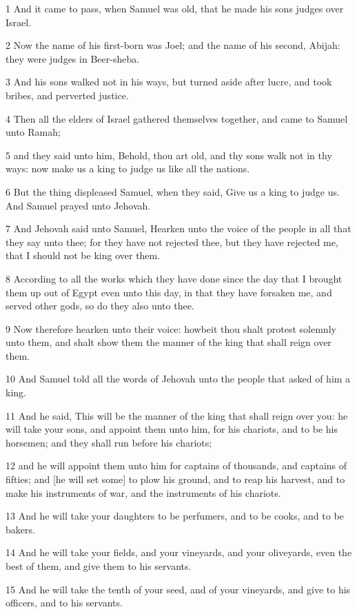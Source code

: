 \par 1 And it came to pass, when Samuel was old, that he made his sons judges over Israel.
\par 2 Now the name of his first-born was Joel; and the name of his second, Abijah: they were judges in Beer-sheba.
\par 3 And his sons walked not in his ways, but turned aside after lucre, and took bribes, and perverted justice.
\par 4 Then all the elders of Israel gathered themselves together, and came to Samuel unto Ramah;
\par 5 and they said unto him, Behold, thou art old, and thy sons walk not in thy ways: now make us a king to judge us like all the nations.
\par 6 But the thing displeased Samuel, when they said, Give us a king to judge us. And Samuel prayed unto Jehovah.
\par 7 And Jehovah said unto Samuel, Hearken unto the voice of the people in all that they say unto thee; for they have not rejected thee, but they have rejected me, that I should not be king over them.
\par 8 According to all the works which they have done since the day that I brought them up out of Egypt even unto this day, in that they have forsaken me, and served other gods, so do they also unto thee.
\par 9 Now therefore hearken unto their voice: howbeit thou shalt protest solemnly unto them, and shalt show them the manner of the king that shall reign over them.
\par 10 And Samuel told all the words of Jehovah unto the people that asked of him a king.
\par 11 And he said, This will be the manner of the king that shall reign over you: he will take your sons, and appoint them unto him, for his chariots, and to be his horsemen; and they shall run before his chariots;
\par 12 and he will appoint them unto him for captains of thousands, and captains of fifties; and [he will set some] to plow his ground, and to reap his harvest, and to make his instruments of war, and the instruments of his chariots.
\par 13 And he will take your daughters to be perfumers, and to be cooks, and to be bakers.
\par 14 And he will take your fields, and your vineyards, and your oliveyards, even the best of them, and give them to his servants.
\par 15 And he will take the tenth of your seed, and of your vineyards, and give to his officers, and to his servants.
